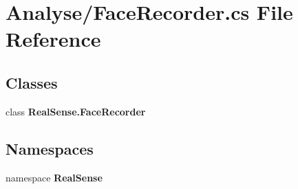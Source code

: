 \section{Analyse/\+Face\+Recorder.cs File Reference}
\label{_face_recorder_8cs}
\subsection*{Classes}
\begin{DoxyCompactItemize}
\item 
class \textbf{ Real\+Sense.\+Face\+Recorder}
\end{DoxyCompactItemize}
\subsection*{Namespaces}
\begin{DoxyCompactItemize}
\item 
namespace \textbf{ Real\+Sense}
\end{DoxyCompactItemize}

